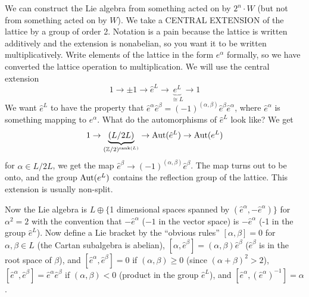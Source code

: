  We can construct the Lie algebra from something acted on by $2^n\cdot W$ (but not
 from something acted on by $W$). We take a CENTRAL EXTENSION
 of the lattice by a group of order 2. Notation is a pain because the lattice is
 written additively and the extension is nonabelian, so you want it to be written
 multiplicatively. Write elements of the lattice in the form $e^\alpha$ formally, so
 we have converted the lattice operation to multiplication. We will use the central
 extension
 \[
    1\to \pm 1 \to \hat e^L\to \underbrace{e^L}_{\cong L}\to 1
 \]
 We want $\hat e^L$ to have the property that $\hat e^\alpha \hat e^\beta =
 (-1)^{(\alpha,\beta)} \hat e^\beta \hat e^\alpha$, where $\hat e^\alpha$ is something
 mapping to $e^\alpha$. What do the automorphisms of $\hat e^L$ look like? We get
 \[
    1\to \underbrace{(L/2L)}_{(\mathbb{Z}/2)^{\mathrm{rank}(L)}} \to \operatorname{Aut} (\hat e^L) \to \operatorname{Aut} (e^L)
 \]
 for $\alpha\in L/2L$, we get the map $\hat e^\beta \to (-1)^{(\alpha,\beta)}\hat
 e^\beta$. The map turns out to be onto, and the group $\operatorname{Aut}(e^L)$ contains the
 reflection group of the lattice. This extension is usually non-split.

 Now the Lie algebra is $L\oplus \{$1 dimensional spaces spanned by $(\hat e^\alpha,-\hat
 e^\alpha)\}$ for $\alpha^2=2$ with the convention that $-\hat e^\alpha$ ($-1$ in the
 vector space) is $-\hat e^\alpha$ (-1 in the group $\hat e^L$). Now define a Lie
 bracket by the ``obvious rules'' $[\alpha,\beta]=0$ for $\alpha,\beta \in L$ (the
 Cartan subalgebra is abelian), $[\alpha,\hat e^\beta] = (\alpha,\beta)\hat e^\beta$ ($\hat
 e^\beta$ is in the root space of $\beta$), and $[\hat e^\alpha,\hat e^\beta]=0$ if
 $(\alpha,\beta)\ge 0$ (since $(\alpha+\beta)^2>2$), $[\hat e^\alpha,\hat e^\beta]
 = \hat e^\alpha \hat e^\beta$ if $(\alpha,\beta)<0$ (product in the group $\hat e^L$), and $[\hat
 e^\alpha,(\hat e^\alpha)^{-1}]=\alpha$.

